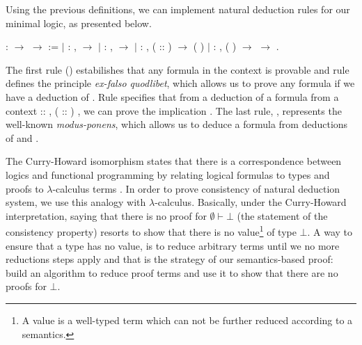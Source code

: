 Using the previous definitions, we can implement natural deduction rules for our minimal logic, as presented below.
\begin{coqdoccode}
\coqdocemptyline
\coqdocemptyline
\coqdocnoindent
{}  : \coqdocvar{$\Gamma$} \ensuremath{\rightarrow} \coqdocvar{$\alpha$} \ensuremath{\rightarrow}  :=\coqdoceol
\coqdocnoindent
\ensuremath{|}  : \coqdockw{\ensuremath{\forall}}  ,    \ensuremath{\rightarrow}   \coqdoceol
\coqdocnoindent
\ensuremath{|}  : \coqdockw{\ensuremath{\forall}}  ,    \ensuremath{\rightarrow}   \coqdoceol
\coqdocnoindent
\ensuremath{|}  : \coqdockw{\ensuremath{\forall}}   ,  ( :: )  \ensuremath{\rightarrow}   (  )\coqdoceol
\coqdocnoindent
\ensuremath{|}  : \coqdockw{\ensuremath{\forall}}   ,   (  ) \ensuremath{\rightarrow}    \ensuremath{\rightarrow}   .\coqdoceol
\coqdocemptyline
\end{coqdoccode}
The first rule () estabilishes that any formula in the context is provable and rule  defines
the principle \emph{ex-falso quodlibet}, which allows us to prove any formula if we have a deduction of .
Rule  specifies that from a deduction of a formula  from a context  :: ,  ( :: ) ,
we can prove the implication   . The last rule, , represents the well-known \emph{modus-ponens},
which allows us to deduce a formula  from deductions of    and .


The Curry-Howard isomorphism states that there is a correspondence between logics and functional programming by
relating logical formulas to types and proofs to $\lambda$-calculus terms \cite{Sorensen06}. In order to prove
consistency of natural deduction system, we use this analogy with $\lambda$-calculus. Basically, under the
Curry-Howard interpretation, saying that there is no proof for $\emptyset \vdash \bot$
(the statement of the consistency property) resorts to show that there is no value\footnote{A value is a well-typed term
which can not be further reduced according to a semantics.} of type $\bot$. A way to ensure that a type
has no value, is to reduce arbitrary terms until we no more reductions steps apply and that is the strategy of our
semantics-based proof: build an algorithm to reduce proof terms and use it to show that there are no proofs
for $\bot$.



